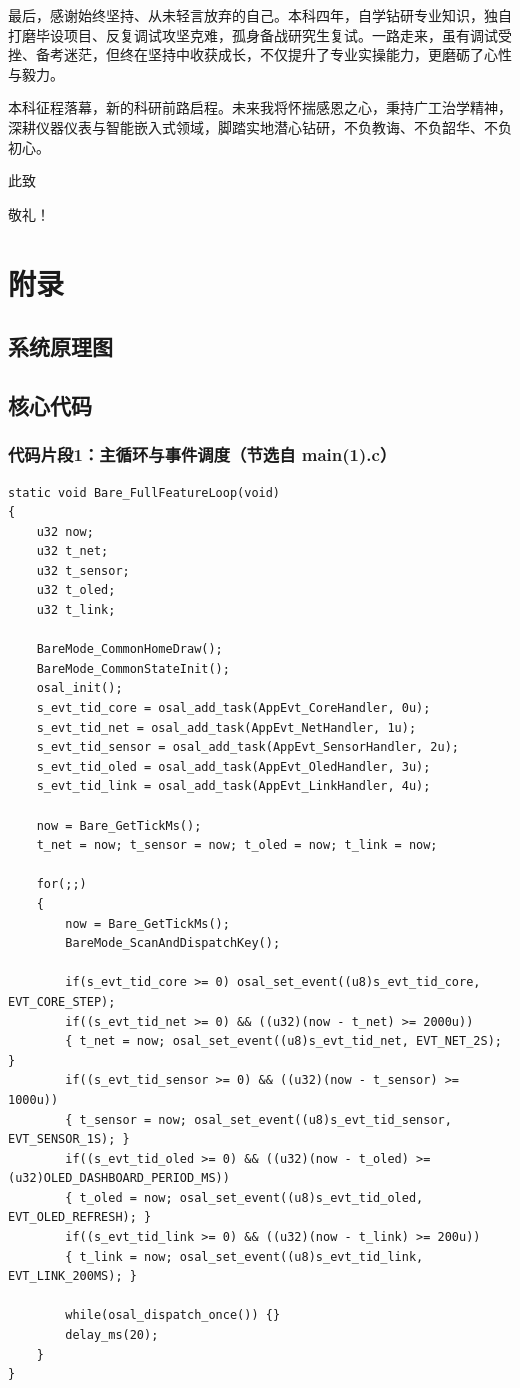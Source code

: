 \documentclass[UTF8,12pt,a4paper,oneside]{ctexbook}
\numberwithin{equation}{chapter}
\begin{document}
最后，感谢始终坚持、从未轻言放弃的自己。本科四年，自学钻研专业知识，独自打磨毕设项目、反复调试攻坚克难，孤身备战研究生复试。一路走来，虽有调试受挫、备考迷茫，但终在坚持中收获成长，不仅提升了专业实操能力，更磨砺了心性与毅力。

本科征程落幕，新的科研前路启程。未来我将怀揣感恩之心，秉持广工治学精神，深耕仪器仪表与智能嵌入式领域，脚踏实地潜心钻研，不负教诲、不负韶华、不负初心。

此致

敬礼！

\appendix
\chapter{附录}
\section{系统原理图}
\section{核心代码}

\subsection*{代码片段1：主循环与事件调度（节选自 main(1).c）}
\begin{verbatim}
static void Bare_FullFeatureLoop(void)
{
    u32 now;
    u32 t_net;
    u32 t_sensor;
    u32 t_oled;
    u32 t_link;

    BareMode_CommonHomeDraw();
    BareMode_CommonStateInit();
    osal_init();
    s_evt_tid_core = osal_add_task(AppEvt_CoreHandler, 0u);
    s_evt_tid_net = osal_add_task(AppEvt_NetHandler, 1u);
    s_evt_tid_sensor = osal_add_task(AppEvt_SensorHandler, 2u);
    s_evt_tid_oled = osal_add_task(AppEvt_OledHandler, 3u);
    s_evt_tid_link = osal_add_task(AppEvt_LinkHandler, 4u);

    now = Bare_GetTickMs();
    t_net = now; t_sensor = now; t_oled = now; t_link = now;

    for(;;)
    {
        now = Bare_GetTickMs();
        BareMode_ScanAndDispatchKey();

        if(s_evt_tid_core >= 0) osal_set_event((u8)s_evt_tid_core, EVT_CORE_STEP);
        if((s_evt_tid_net >= 0) && ((u32)(now - t_net) >= 2000u))
        { t_net = now; osal_set_event((u8)s_evt_tid_net, EVT_NET_2S); }
        if((s_evt_tid_sensor >= 0) && ((u32)(now - t_sensor) >= 1000u))
        { t_sensor = now; osal_set_event((u8)s_evt_tid_sensor, EVT_SENSOR_1S); }
        if((s_evt_tid_oled >= 0) && ((u32)(now - t_oled) >= (u32)OLED_DASHBOARD_PERIOD_MS))
        { t_oled = now; osal_set_event((u8)s_evt_tid_oled, EVT_OLED_REFRESH); }
        if((s_evt_tid_link >= 0) && ((u32)(now - t_link) >= 200u))
        { t_link = now; osal_set_event((u8)s_evt_tid_link, EVT_LINK_200MS); }

        while(osal_dispatch_once()) {}
        delay_ms(20);
    }
}
\end{verbatim}
\end{document}

